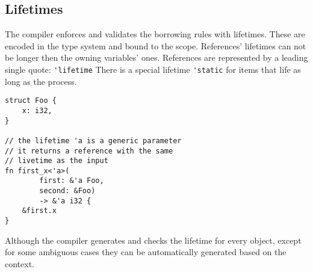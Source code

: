 \documentclass[conference,twocolumn]{IEEEtran}
\begin{document}
\subsection{Lifetimes}
The compiler enforces and validates the borrowing rules with lifetimes. These are encoded in the type system and bound to the scope. References' lifetimes can not be longer then the owning variables' ones.
References are represented by a leading single quote: \verb|'lifetime|
There is a special lifetime \verb|'static| for items that life as long as the process.

\begin{lstlisting}
struct Foo {
    x: i32,
}

// the lifetime 'a is a generic parameter
// it returns a reference with the same 
// livetime as the input
fn first_x<'a>(
        first: &'a Foo,
        second: &Foo)
        -> &'a i32 {
    &first.x
}
\end{lstlisting}

Although the compiler generates and checks the lifetime for every object, except for some ambiguous cases they can be automatically generated based on the context.
\end{document}
